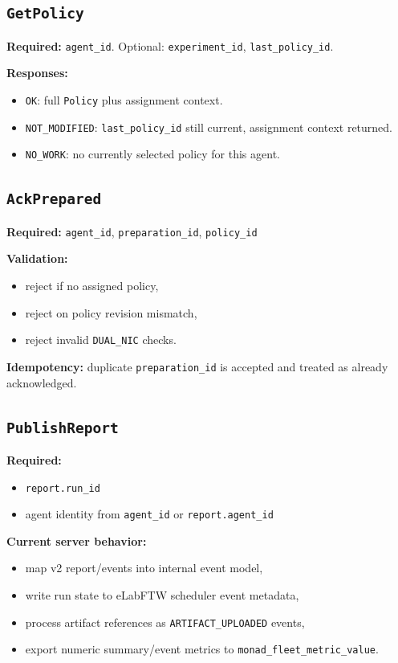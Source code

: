 \documentclass[11pt,a4paper]{article}
\begin{document}
\subsection{\texttt{GetPolicy}}
\textbf{Required:} \texttt{agent\_id}. Optional: \texttt{experiment\_id}, \texttt{last\_policy\_id}.

\textbf{Responses:}
\begin{itemize}
  \item \texttt{OK}: full \texttt{Policy} plus assignment context.
  \item \texttt{NOT\_MODIFIED}: \texttt{last\_policy\_id} still current, assignment context returned.
  \item \texttt{NO\_WORK}: no currently selected policy for this agent.
\end{itemize}

\subsection{\texttt{AckPrepared}}
\textbf{Required:} \texttt{agent\_id}, \texttt{preparation\_id}, \texttt{policy\_id}

\textbf{Validation:}
\begin{itemize}
  \item reject if no assigned policy,
  \item reject on policy revision mismatch,
  \item reject invalid \texttt{DUAL\_NIC} checks.
\end{itemize}

\textbf{Idempotency:}
duplicate \texttt{preparation\_id} is accepted and treated as already acknowledged.

\subsection{\texttt{PublishReport}}
\textbf{Required:}
\begin{itemize}
  \item \texttt{report.run\_id}
  \item agent identity from \texttt{agent\_id} or \texttt{report.agent\_id}
\end{itemize}

\textbf{Current server behavior:}
\begin{itemize}
  \item map v2 report/events into internal event model,
  \item write run state to eLabFTW scheduler event metadata,
  \item process artifact references as \texttt{ARTIFACT\_UPLOADED} events,
  \item export numeric summary/event metrics to \texttt{monad\_fleet\_metric\_value}.
\end{itemize}
\end{document}
